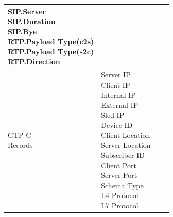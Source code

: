 \begin{description}
\begin{longtable}{p{}|p{}|p{}|p{}}
{                                                                                                    SIP.Server\\
                                                                                                    SIP.Duration\\
                                                                                                    SIP.Bye\\
                                                                                                    RTP.Payload Type(c2s)\\
                                                                                                    RTP.Payload Type(s2c)\\
                                                                                                    RTP.Direction
                                                                                                    }  \\ \hline 
    \tabincell{l}{GTP-C\\ Records} &   \tabincell{l}{Server IP\\
                                                            Client IP\\
                                                            Internal IP\\
                                                            External IP\\
                                                            Sled IP\\
                                                            Device ID\\
                                                            Client Location\\
                                                            Server Location\\
                                                            Subscriber ID\\
                                                            Client Port\\
                                                            Server Port\\
                                                            Schema Type\\
                                                            L4 Protocol\\
                                                            L7 Protocol\\
}
\end{longtable}
\end{description}
